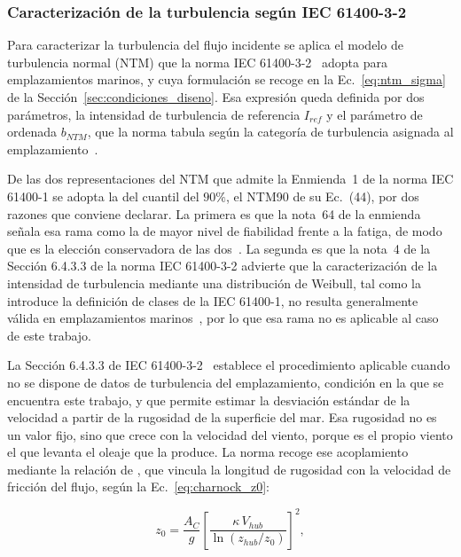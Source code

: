 \subsubsection{Caracterización de la turbulencia según IEC 61400-3-2}
\label{sec:ntm}

Para caracterizar la turbulencia del flujo incidente se aplica el modelo de turbulencia normal (NTM) que la norma IEC 61400-3-2~\parencite*{IEC61400-3-2} adopta para emplazamientos marinos, y cuya formulación se recoge en la Ec.~\ref{eq:ntm_sigma} de la Sección~\ref{sec:condiciones_diseno}. Esa expresión queda definida por dos parámetros, la intensidad de turbulencia de referencia $I_{ref}$ y el parámetro de ordenada $b_{NTM}$, que la norma tabula según la categoría de turbulencia asignada al emplazamiento~\parencite{IEC61400-1}.

De las dos representaciones del NTM que admite la Enmienda~1 de la norma IEC 61400-1 se adopta la del cuantil del $90\%$, el NTM90 de su Ec.~(44), por dos razones que conviene declarar. La primera es que la nota~64 de la enmienda señala esa rama como la de mayor nivel de fiabilidad frente a la fatiga, de modo que es la elección conservadora de las dos~\parencite{IEC61400-1-AMD1}. La segunda es que la nota~4 de la Sección 6.4.3.3 de la norma IEC 61400-3-2 advierte que la caracterización de la intensidad de turbulencia mediante una distribución de Weibull, tal como la introduce la definición de clases de la IEC 61400-1, no resulta generalmente válida en emplazamientos marinos~\parencite{IEC61400-3-2}, por lo que esa rama no es aplicable al caso de este trabajo.

La Sección 6.4.3.3 de IEC 61400-3-2~\parencite*{IEC61400-3-2} establece el procedimiento aplicable cuando no se dispone de datos de turbulencia del emplazamiento, condición en la que se encuentra este trabajo, y que permite estimar la desviación estándar de la velocidad a partir de la rugosidad de la superficie del mar. Esa rugosidad no es un valor fijo, sino que crece con la velocidad del viento, porque es el propio viento el que levanta el oleaje que la produce. La norma recoge ese acoplamiento mediante la relación de \textcite{Charnock1955}, que vincula la longitud de rugosidad con la velocidad de fricción del flujo, según la Ec.~\ref{eq:charnock_z0}:

\begin{equation}
    z_0 = \frac{A_C}{g} \left[ \frac{\kappa \, V_{hub}}{\ln \left( z_{hub} / z_0 \right)} \right]^2,
    \label{eq:charnock_z0}
\end{equation}

